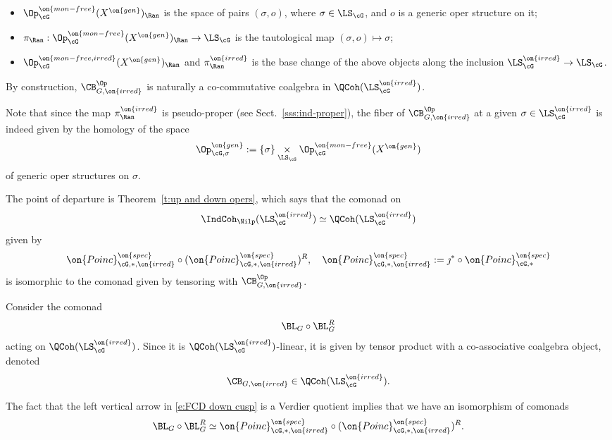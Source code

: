 \documentclass[9pt]{amsart}
\theoremstyle{remark}
\theoremstyle{definition}
\theoremstyle{remark}
\newcommand{\thmref}[1]{Theorem~\ref{#1}}
\newcommand{\secref}[1]{Sect.~\ref{#1}}
\numberwithin{equation}{section}
\begin{document}
\begin{itemize}

\item $\Op^{\on{mon-free}}_\cG(X^{\on{gen}})_\Ran$ is the space of pairs $(\sigma,o)$, where $\sigma\in \LS_\cG$,
and $o$ is a generic oper structure on it;

\smallskip

\item $\pi_\Ran:\Op^{\on{mon-free}}_\cG(X^{\on{gen}})_\Ran\to \LS_\cG$ is the tautological map $(\sigma,o)\mapsto \sigma$;

\smallskip

\item $\Op^{\on{mon-free,irred}}_\cG(X^{\on{gen}})_\Ran$ and $\pi^{\on{irred}}_\Ran$ is the base change of the above objects
along the inclusion $\LS^{\on{irred}}_\cG\to \LS_\cG$.

\end{itemize} 

By construction, $\CB^{\Op}_{G,\on{irred}}$ is naturally a co-commutative coalgebra in $\QCoh(\LS^{\on{irred}}_\cG)$.

\medskip

Note that since the map $\pi^{\on{irred}}_\Ran$ is pseudo-proper (see \secref{sss:ind-proper}), 
the fiber of $\CB^{\Op}_{G,\on{irred}}$ at a given $\sigma\in \LS^{\on{irred}}_\cG$
is indeed given by the homology of the space 
$$\Op^{\on{gen}}_{\cG,\sigma}:=\{\sigma\} \underset{\LS_\cG}\times \Op^{\on{mon-free}}_\cG(X^{\on{gen}})$$
of generic oper structures on $\sigma$. 

\sssec{}

The point of departure is \thmref{t:up and down opers}, which says that the comonad on 
$$\IndCoh_\Nilp(\LS^{\on{irred}}_\cG) \simeq \QCoh(\LS^{\on{irred}}_\cG)$$ 
given by 
$$\on{Poinc}^{\on{spec}}_{\cG,*,\on{irred}}\circ (\on{Poinc}^{\on{spec}}_{\cG,*,\on{irred}})^R, \quad 
\on{Poinc}^{\on{spec}}_{\cG,*,\on{irred}}:=\jmath^*\circ \on{Poinc}^{\on{spec}}_{\cG,*}$$
is isomorphic to the comonad given by tensoring with $\CB^{\Op}_{G,\on{irred}}$. 

\sssec{}

Consider the comonad 
$$\BL_G\circ \BL_G^R$$ acting on $\QCoh(\LS^{\on{irred}}_\cG)$. Since it is $\QCoh(\LS^{\on{irred}}_\cG)$-linear, 
it is given by tensor product with a co-associative coalgebra object, denoted 
$$\CB_{G,\on{irred}}\in \QCoh(\LS^{\on{irred}}_\cG).$$

\medskip

The fact that the left vertical arrow in \eqref{e:FCD down cusp} is a Verdier quotient implies that we have an isomorphism of comonads
$$\BL_G\circ \BL_G^R \simeq \on{Poinc}^{\on{spec}}_{\cG,*,\on{irred}}\circ (\on{Poinc}^{\on{spec}}_{\cG,*,\on{irred}})^R.$$
\end{document}
